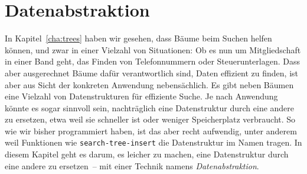 
\chapter{Datenabstraktion}
\label{chap:datenabstraktion}


In Kapitel~\ref{cha:trees} haben wir gesehen, dass Bäume beim Suchen
helfen können, und zwar in einer Vielzahl von Situationen: Ob es nun
um Mitgliedschaft in einer Band geht, das Finden von Telefonnummern
oder Steuerunterlagen.  Dass aber ausgerechnet Bäume dafür
verantwortlich sind, Daten effizient zu finden, ist aber aus Sicht der
konkreten Anwendung nebensächlich.  Es gibt neben Bäumen eine Vielzahl
von Datenstrukturen für effiziente Suche.  Je nach Anwendung könnte es
sogar sinnvoll sein, nachträglich eine Datenstruktur durch eine andere
zu ersetzen, etwa weil sie schneller ist oder weniger Speicherplatz
verbraucht.  So wie wir bisher programmiert haben, ist das aber recht
aufwendig, unter anderem weil Funktionen wie
\lstinline{search-tree-insert} die Datenstruktur im Namen tragen.  In
diesem Kapitel geht es darum, es leicher zu machen, eine Datenstruktur
durch eine andere zu ersetzen~-- mit einer Technik namens
\textit{Datenabstraktion}.




